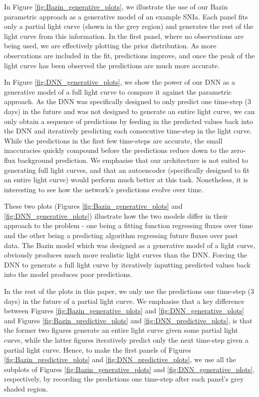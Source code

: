 \documentclass[fleqn,usenatbib]{mnras}
\begin{document}
In Figure \ref{fig:Bazin_generative_plots}, we illustrate the use of our Bazin parametric approach as a generative model of an example SNIa. Each panel fits only a partial light curve (shown in the grey region) and generates the rest of the light curve from this information. In the first panel, where no observations are being used, we are effectively plotting the prior distribution. As more observations are included in the fit, predictions improve, and once the peak of the light curve has been observed the predictions are much more accurate. 

In Figure \ref{fig:DNN_generative_plots}, we show the power of our DNN as a generative model of a full light curve to compare it against the parametric approach. As the DNN was specifically designed to only predict one time-step (3 days) in the future and was not designed to generate an entire light curve, we can only obtain a sequence of predictions by feeding in the predicted values back into the DNN and iteratively predicting each consecutive time-step in the light curve. While the predictions in the first few time-steps are accurate, the small inaccuracies quickly compound before the predictions reduce down to the zero-flux background prediction. We emphasise that our architecture is not suited to generating full light curves, and that an autoencoder (specifically designed to fit an entire light curve) would perform much better at this task. Nonetheless, it is interesting to see how the network's predictions evolve over time.

These two plots (Figures \ref{fig:Bazin_generative_plots} and \ref{fig:DNN_generative_plots}) illustrate how the two models differ in their approach to the problem - one being a fitting function regressing fluxes over time and the other being a predicting algorithm regressing future fluxes over past data. The Bazin model which was designed as a generative model of a light curve, obviously produces much more realistic light curves than the DNN. Forcing the DNN to generate a full light curve by iteratively inputting predicted values back into the model produces poor predictions.

In the rest of the plots in this paper, we only use the predictions one time-step (3 days) in the future of a partial light curve. We emphasise that a key difference between Figures \ref{fig:Bazin_generative_plots} and \ref{fig:DNN_generative_plots} and Figures \ref{fig:Bazin_predictive_plots} and \ref{fig:DNN_predictive_plots}, is that the former two figures generate an entire light curve given some partial light curve, while the latter figures iteratively predict only the next time-step given a partial light curve. Hence, to make the first panels of Figures \ref{fig:Bazin_predictive_plots} and \ref{fig:DNN_predictive_plots}, we use all the subplots of Figures \ref{fig:Bazin_generative_plots} and \ref{fig:DNN_generative_plots}, respectively, by recording the predictions one time-step after each panel's grey shaded region.
\end{document}
